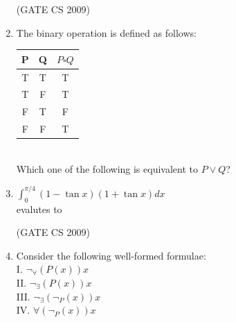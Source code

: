 \documentclass[a4paper, 11pt]{article}
\begin{document}
\begin{enumerate}
    \hfill (GATE CS 2009)

    \item  The binary operation is defined as follows:\\
    \begin{tabular}{|c|c|c|}
        \hline
        P & Q & $P\square Q$ \\
        \hline
        T & T & T \\
        \hline
        T & F & T \\
        \hline
        F & T & F \\
        \hline
        F & F & T\\
        \hline
    \end{tabular}\\
    Which one of the following is equivalent to $P \lor Q$?\\
    \begin{enumerate}
    \end{enumerate}

    \item $\int_0^{\pi/4} (1 - \tan x)(1 + \tan x)dx$\\
    evalutes to\\
    \begin{enumerate}
    \end{enumerate}

    \hfill (GATE CS 2009)

    \item Consider the following well-formed formulae:\\
    I. $\neg_ \forall (P(x))x$\\
    II. $\neg_ \exists (P(x))x$\\
    III. $\neg_ \exists (\neg_ P(x))x$\\
    IV. $\forall (\neg_ P(x))x$


\end{enumerate}
\end{document}
